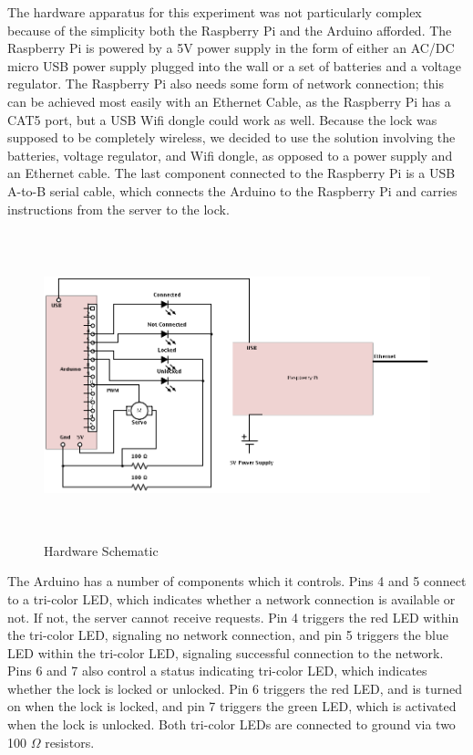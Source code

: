 \documentclass[10pt]{article}
\begin{document}
\begin{multicols}{2}
The hardware apparatus for this experiment was not particularly complex because of the simplicity both the Raspberry Pi and the Arduino afforded. The Raspberry Pi is powered by a 5V power supply in the form of either an AC/DC micro USB power supply plugged into the wall or a set of batteries and a voltage regulator. The Raspberry Pi also needs some form of network connection; this can be achieved most easily with an Ethernet Cable, as the Raspberry Pi has a CAT5 port, but a USB Wifi dongle could work as well. Because the lock was supposed to be completely wireless, we decided to use the solution involving the batteries, voltage regulator, and Wifi dongle, as opposed to a power supply and an Ethernet cable. The last component connected to the Raspberry Pi is a USB A-to-B serial cable, which connects the Arduino to the Raspberry Pi and carries instructions from the server to the lock. \\

\begin{figure}[t!]
\centering
\includegraphics[height=3.5in]{circuit.png}
\caption{Hardware Schematic}
\end{figure}

The Arduino has a number of components which it controls. Pins 4 and 5 connect to a tri-color LED, which indicates whether a network connection is available or not. If not, the server cannot receive requests. Pin 4 triggers the red LED within the tri-color LED, signaling no network connection, and pin 5 triggers the blue LED within the tri-color LED, signaling successful connection to the network. Pins 6 and 7 also control a status indicating tri-color LED, which indicates whether the lock is locked or unlocked. Pin 6 triggers the red LED, and is turned on when the lock is locked, and pin 7 triggers the green LED, which is activated when the lock is unlocked. Both tri-color LEDs are connected to ground via two 100 $\Omega$ resistors. \\


\end{multicols}
\end{document}
